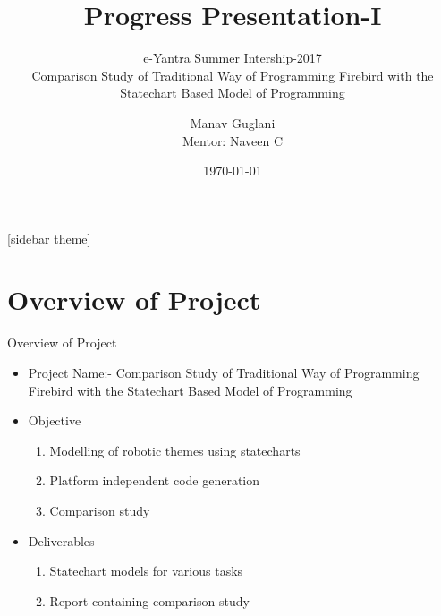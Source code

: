\documentclass[10pt, a4paper]{beamer}
\begin{document}
	\title{Progress Presentation-I}
	\subtitle{e-Yantra Summer Intership-2017 \\Comparison Study of Traditional Way of Programming
		Firebird with the Statechart Based Model of
		Programming}
	\author{Manav Guglani\\
	Mentor: Naveen C}
	\date{\today}
	\frame{\titlepage}

[sidebar theme]
\section{Overview of Project}
\begin{frame}{Overview of Project}
	\begin{itemize}
		\item Project Name:- Comparison Study of Traditional Way of Programming
		Firebird with the Statechart Based Model of
		Programming
		\item Objective
		\begin{enumerate}
			\item Modelling of robotic themes using statecharts
			\item Platform independent code generation
			\item Comparison study
		\end{enumerate}
		\item Deliverables
		\begin{enumerate}
			\item  Statechart  models for various tasks
			\item Report containing comparison study
		\end{enumerate}
	\end{itemize}
\end{frame}
\end{document}
